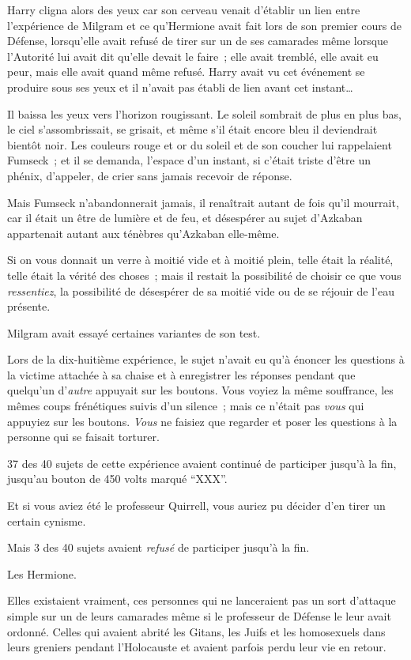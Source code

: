Harry cligna alors des yeux car son cerveau venait d'établir un lien entre l'expérience de Milgram et ce qu'Hermione avait fait lors de son premier cours de Défense, lorsqu'elle avait refusé de tirer sur un de ses camarades même lorsque l'Autorité lui avait dit qu'elle devait le faire~; elle avait tremblé, elle avait eu peur, mais elle avait quand même refusé.
Harry avait vu cet événement se produire sous ses yeux et il n'avait pas établi de lien avant cet instant…

Il baissa les yeux vers l'horizon rougissant.
Le soleil sombrait de plus en plus bas, le ciel s'assombrissait, se grisait, et même s'il était encore bleu il deviendrait bientôt noir.
Les couleurs rouge et or du soleil et de son coucher lui rappelaient Fumseck~; et il se demanda, l'espace d'un instant, si c'était triste d'être un phénix, d'appeler, de crier sans jamais recevoir de réponse.

Mais Fumseck n'abandonnerait jamais, il renaîtrait autant de fois qu'il mourrait, car il était un être de lumière et de feu, et désespérer au sujet d'Azkaban appartenait autant aux ténèbres qu'Azkaban elle-même.

Si on vous donnait un verre à moitié vide et à moitié plein, telle était la réalité, telle était la vérité des choses~; mais il restait la possibilité de choisir ce que vous \emph{ressentiez}, la possibilité de désespérer de sa moitié vide ou de se réjouir de l'eau présente.

Milgram avait essayé certaines variantes de son test.

Lors de la dix-huitième expérience, le sujet n'avait eu qu'à énoncer les questions à la victime attachée à sa chaise et à enregistrer les réponses pendant que quelqu'un d'\emph{autre} appuyait sur les boutons.
Vous voyiez la même souffrance, les mêmes coups frénétiques suivis d'un silence~; mais ce n'était pas \emph{vous} qui appuyiez sur les boutons.
\emph{Vous} ne faisiez que regarder et poser les questions à la personne qui se faisait torturer.

37 des 40 sujets de cette expérience avaient continué de participer jusqu'à la fin, jusqu'au bouton de 450 volts marqué “XXX”.

Et si vous aviez été le professeur Quirrell, vous auriez pu décider d'en tirer un certain cynisme.

Mais 3 des 40 sujets avaient \emph{refusé} de participer jusqu'à la fin.

Les Hermione.

Elles existaient vraiment, ces personnes qui ne lanceraient pas un sort d'attaque simple sur un de leurs camarades même si le professeur de Défense le leur avait ordonné.
Celles qui avaient abrité les Gitans, les Juifs et les homosexuels dans leurs greniers pendant l'Holocauste et avaient parfois perdu leur vie en retour.

